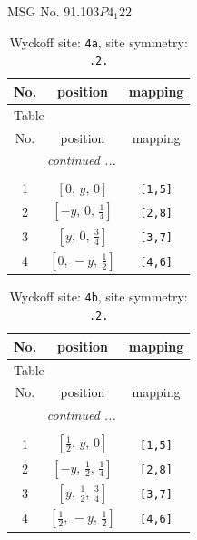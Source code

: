 \documentclass[fleqn,8pt]{jsarticle}
\begin{document}
\setcounter{MaxMatrixCols}{32}

\renewcommand{\tablename}{Table~}
\renewcommand{\figurename}{Figure~}
\begin{center}
\LARGE
MSG No. 91.103\quad$P4_{1}22$
\end{center}
\renewcommand{\arraystretch}{1.2}
\begin{longtable}{ccc}
\caption{Wyckoff site: {\tt 4a}, site symmetry: {\tt .2.}}
 \\
 \hline \hline
No. & position & mapping \\ \hline \endfirsthead

\multicolumn{2}{l}{\tablename\ \thetable{}} \\
 \hline \hline
No. & position & mapping \\ \hline \endhead

 \hline \hline
\multicolumn{2}{r}{\footnotesize\it continued ...} \\ \endfoot

 \hline \hline
\multicolumn{2}{r}{} \\ \endlastfoot

1 & $\left[ 0,\, y,\, 0 \right]$ & {\tt [1,5]} \\ \hline
2 & $\left[ - y,\, 0,\, \frac{1}{4} \right]$ & {\tt [2,8]} \\ \hline
3 & $\left[ y,\, 0,\, \frac{3}{4} \right]$ & {\tt [3,7]} \\ \hline
4 & $\left[ 0,\, - y,\, \frac{1}{2} \right]$ & {\tt [4,6]} \\
\end{longtable}
\renewcommand{\arraystretch}{1.2}
\begin{longtable}{ccc}
\caption{Wyckoff site: {\tt 4b}, site symmetry: {\tt .2.}}
 \\
 \hline \hline
No. & position & mapping \\ \hline \endfirsthead

\multicolumn{2}{l}{\tablename\ \thetable{}} \\
 \hline \hline
No. & position & mapping \\ \hline \endhead

 \hline \hline
\multicolumn{2}{r}{\footnotesize\it continued ...} \\ \endfoot

 \hline \hline
\multicolumn{2}{r}{} \\ \endlastfoot

1 & $\left[ \frac{1}{2},\, y,\, 0 \right]$ & {\tt [1,5]} \\ \hline
2 & $\left[ - y,\, \frac{1}{2},\, \frac{1}{4} \right]$ & {\tt [2,8]} \\ \hline
3 & $\left[ y,\, \frac{1}{2},\, \frac{3}{4} \right]$ & {\tt [3,7]} \\ \hline
4 & $\left[ \frac{1}{2},\, - y,\, \frac{1}{2} \right]$ & {\tt [4,6]} \\
\end{longtable}
\end{document}
